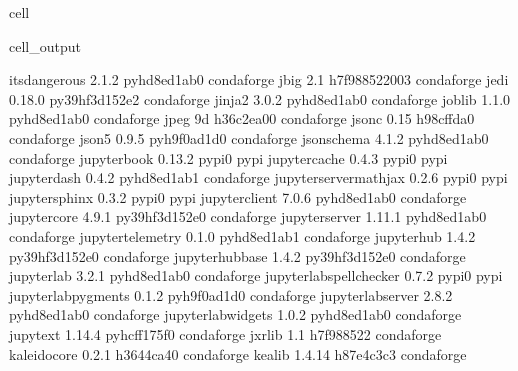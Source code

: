 \documentclass[letterpaper,table,10pt,english]{jupyterBook}
\begin{document}
\begin{sphinxuseclass}{cell}
\begin{sphinxVerbatimOutput}
\begin{sphinxuseclass}{cell_output}
\begin{sphinxVerbatim}[commandchars=\\\{\}]
itsdangerous              2.1.2              pyhd8ed1ab\PYGZus{}0    conda\PYGZhy{}forge
jbig                      2.1               h7f98852\PYGZus{}2003    conda\PYGZhy{}forge
jedi                      0.18.0           py39hf3d152e\PYGZus{}2    conda\PYGZhy{}forge
jinja2                    3.0.2              pyhd8ed1ab\PYGZus{}0    conda\PYGZhy{}forge
joblib                    1.1.0              pyhd8ed1ab\PYGZus{}0    conda\PYGZhy{}forge
jpeg                      9d                   h36c2ea0\PYGZus{}0    conda\PYGZhy{}forge
json\PYGZhy{}c                    0.15                 h98cffda\PYGZus{}0    conda\PYGZhy{}forge
json5                     0.9.5              pyh9f0ad1d\PYGZus{}0    conda\PYGZhy{}forge
jsonschema                4.1.2              pyhd8ed1ab\PYGZus{}0    conda\PYGZhy{}forge
jupyter\PYGZhy{}book              0.13.2                   pypi\PYGZus{}0    pypi
jupyter\PYGZhy{}cache             0.4.3                    pypi\PYGZus{}0    pypi
jupyter\PYGZhy{}dash              0.4.2              pyhd8ed1ab\PYGZus{}1    conda\PYGZhy{}forge
jupyter\PYGZhy{}server\PYGZhy{}mathjax    0.2.6                    pypi\PYGZus{}0    pypi
jupyter\PYGZhy{}sphinx            0.3.2                    pypi\PYGZus{}0    pypi
jupyter\PYGZus{}client            7.0.6              pyhd8ed1ab\PYGZus{}0    conda\PYGZhy{}forge
jupyter\PYGZus{}core              4.9.1            py39hf3d152e\PYGZus{}0    conda\PYGZhy{}forge
jupyter\PYGZus{}server            1.11.1             pyhd8ed1ab\PYGZus{}0    conda\PYGZhy{}forge
jupyter\PYGZus{}telemetry         0.1.0              pyhd8ed1ab\PYGZus{}1    conda\PYGZhy{}forge
jupyterhub                1.4.2            py39hf3d152e\PYGZus{}0    conda\PYGZhy{}forge
jupyterhub\PYGZhy{}base           1.4.2            py39hf3d152e\PYGZus{}0    conda\PYGZhy{}forge
jupyterlab                3.2.1              pyhd8ed1ab\PYGZus{}0    conda\PYGZhy{}forge
jupyterlab\PYGZhy{}spellchecker   0.7.2                    pypi\PYGZus{}0    pypi
jupyterlab\PYGZus{}pygments       0.1.2              pyh9f0ad1d\PYGZus{}0    conda\PYGZhy{}forge
jupyterlab\PYGZus{}server         2.8.2              pyhd8ed1ab\PYGZus{}0    conda\PYGZhy{}forge
jupyterlab\PYGZus{}widgets        1.0.2              pyhd8ed1ab\PYGZus{}0    conda\PYGZhy{}forge
jupytext                  1.14.4             pyhcff175f\PYGZus{}0    conda\PYGZhy{}forge
jxrlib                    1.1                  h7f98852\PYGZus{}2    conda\PYGZhy{}forge
kaleido\PYGZhy{}core              0.2.1                h3644ca4\PYGZus{}0    conda\PYGZhy{}forge
kealib                    1.4.14               h87e4c3c\PYGZus{}3    conda\PYGZhy{}forge

\end{sphinxVerbatim}
\end{sphinxuseclass}
\end{sphinxVerbatimOutput}
\end{sphinxuseclass}
\end{document}
